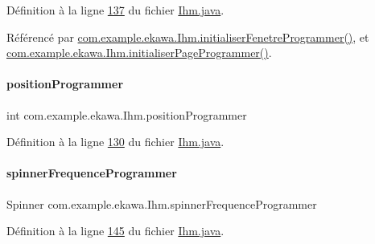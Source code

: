 Définition à la ligne \hyperlink{_ihm_8java_source_l00137}{137} du fichier \hyperlink{_ihm_8java_source}{Ihm.\+java}.



Référencé par \hyperlink{_ihm_8java_source_l00727}{com.\+example.\+ekawa.\+Ihm.\+initialiser\+Fenetre\+Programmer()}, et \hyperlink{_ihm_8java_source_l00668}{com.\+example.\+ekawa.\+Ihm.\+initialiser\+Page\+Programmer()}.

\mbox{\label{classcom_1_1example_1_1ekawa_1_1_ihm_ada29cde0c67d8614d47b27ed04c337e9}} 
\paragraph{\texorpdfstring{position\+Programmer}{positionProgrammer}}
{\footnotesize\ttfamily int com.\+example.\+ekawa.\+Ihm.\+position\+Programmer\hspace{0.3cm}{\ttfamily [private]}}



Définition à la ligne \hyperlink{_ihm_8java_source_l00130}{130} du fichier \hyperlink{_ihm_8java_source}{Ihm.\+java}.

\mbox{\label{classcom_1_1example_1_1ekawa_1_1_ihm_ab266576a3855dbd6e36e346ddb27247a}} 
\paragraph{\texorpdfstring{spinner\+Frequence\+Programmer}{spinnerFrequenceProgrammer}}
{\footnotesize\ttfamily Spinner com.\+example.\+ekawa.\+Ihm.\+spinner\+Frequence\+Programmer\hspace{0.3cm}{\ttfamily [private]}}



Définition à la ligne \hyperlink{_ihm_8java_source_l00145}{145} du fichier \hyperlink{_ihm_8java_source}{Ihm.\+java}.

